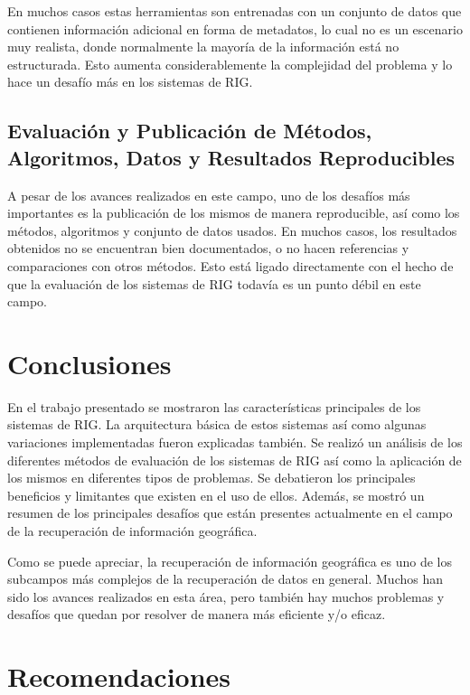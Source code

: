\documentclass{llncs}
\begin{document}
En muchos casos estas herramientas son entrenadas con un conjunto de datos que
contienen información adicional en forma de metadatos, lo cual no es un escenario
muy realista, donde normalmente la mayoría de la información está no estructurada.
Esto aumenta considerablemente la complejidad del problema y lo hace un desafío más
en los sistemas de RIG.

\subsection{Evaluación y Publicación de Métodos, Algoritmos, Datos y
Resultados Reproducibles}\label{sec:publ}

A pesar de los avances realizados en este campo, uno de los desafíos más
importantes es la publicación de los mismos de manera reproducible, así como
los métodos, algoritmos y conjunto de datos usados. En muchos casos, los
resultados obtenidos no se encuentran bien documentados, o no hacen referencias
y comparaciones con otros métodos. Esto está ligado directamente con el hecho
de que la evaluación de los sistemas de RIG todavía es un punto débil en este
campo.

\newpage

\section{Conclusiones}\label{sec:conclusions}

En el trabajo presentado se mostraron las características principales de los
sistemas de RIG. La arquitectura básica de estos sistemas así como algunas
variaciones implementadas fueron explicadas también. Se realizó un análisis de
los diferentes métodos de evaluación de los sistemas de RIG así como la
aplicación de los mismos en diferentes tipos de problemas. Se debatieron los
principales beneficios y limitantes que existen en el uso de ellos.
Además, se mostró un resumen de los principales desafíos que están presentes
actualmente en el campo de la recuperación de información geográfica.

Como se puede apreciar, la recuperación de información geográfica es uno de los
subcampos más complejos de la recuperación de datos en general. Muchos han sido
los avances realizados en esta área, pero también hay muchos problemas y
desafíos que quedan por resolver de manera más eficiente y/o eficaz.


\section{Recomendaciones}\label{sec:recomend}
\end{document}
